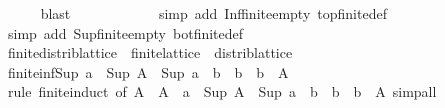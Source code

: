 \begin{isabellebody}
\ \ \ \ \isamarkupfalse%
\ blast\isanewline
{}\isamarkupfalse%
\isanewline
\ \ \isamarkupfalse%
\ {\isachardoublequoteopen}{\isasymSqinter}{\isacharbraceleft}{\kern0pt}{\isacharbraceright}{\kern0pt}\ {\isacharequal}{\kern0pt}\ {\isasymtop}{\isachardoublequoteclose}\isanewline
\ \ \ \ \isamarkupfalse%
\ {\isacharparenleft}{\kern0pt}simp\ add{\isacharcolon}{\kern0pt}\ Inf{\isacharunderscore}{\kern0pt}finite{\isacharunderscore}{\kern0pt}empty\ top{\isacharunderscore}{\kern0pt}finite{\isacharunderscore}{\kern0pt}def{\isacharparenright}{\kern0pt}\isanewline
\ \ \isamarkupfalse%
\ {\isachardoublequoteopen}\ {\isasymSqunion}{\isacharbraceleft}{\kern0pt}{\isacharbraceright}{\kern0pt}\ {\isacharequal}{\kern0pt}\ {\isasymbottom}{\isachardoublequoteclose}\isanewline
\ \ \ \ \isamarkupfalse%
\ {\isacharparenleft}{\kern0pt}simp\ add{\isacharcolon}{\kern0pt}\ Sup{\isacharunderscore}{\kern0pt}finite{\isacharunderscore}{\kern0pt}empty\ bot{\isacharunderscore}{\kern0pt}finite{\isacharunderscore}{\kern0pt}def{\isacharparenright}{\kern0pt}\isanewline
{}\isamarkupfalse%
%
\endisatagproof
{\isafoldproof}%
%
\isadelimproof
\isanewline
%
\endisadelimproof
{}\isamarkupfalse%
\isanewline
\isanewline
{}\isamarkupfalse%
\ finite{\isacharunderscore}{\kern0pt}distrib{\isacharunderscore}{\kern0pt}lattice\ {\isacharequal}{\kern0pt}\ finite{\isacharunderscore}{\kern0pt}lattice\ {\isacharplus}{\kern0pt}\ distrib{\isacharunderscore}{\kern0pt}lattice\ \isanewline
{}\isanewline
{}\isamarkupfalse%
\ finite{\isacharunderscore}{\kern0pt}inf{\isacharunderscore}{\kern0pt}Sup{\isacharcolon}{\kern0pt}\ {\isachardoublequoteopen}a\ {\isasymsqinter}\ {\isacharparenleft}{\kern0pt}Sup\ A{\isacharparenright}{\kern0pt}\ {\isacharequal}{\kern0pt}\ Sup\ {\isacharbraceleft}{\kern0pt}a\ {\isasymsqinter}\ b\ {\isacharbar}{\kern0pt}\ b\ {\isachardot}{\kern0pt}\ b\ {\isasymin}\ A{\isacharbraceright}{\kern0pt}{\isachardoublequoteclose}\isanewline
%
\isadelimproof
%
\endisadelimproof
%
\isatagproof
{}\isamarkupfalse%
\ {\isacharparenleft}{\kern0pt}rule\ finite{\isacharunderscore}{\kern0pt}induct\ {\isacharbrackleft}{\kern0pt}of\ A\ {\isachardoublequoteopen}{\isasymlambda}\ A\ {\isachardot}{\kern0pt}\ a\ {\isasymsqinter}\ {\isacharparenleft}{\kern0pt}Sup\ A{\isacharparenright}{\kern0pt}\ {\isacharequal}{\kern0pt}\ Sup\ {\isacharbraceleft}{\kern0pt}a\ {\isasymsqinter}\ b\ {\isacharbar}{\kern0pt}\ b\ {\isachardot}{\kern0pt}\ b\ {\isasymin}\ A{\isacharbraceright}{\kern0pt}{\isachardoublequoteclose}{\isacharbrackright}{\kern0pt}{\isacharcomma}{\kern0pt}\ simp{\isacharunderscore}{\kern0pt}all{\isacharparenright}{\kern0pt}\isanewline

\end{isabellebody}
